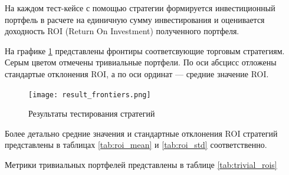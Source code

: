 На каждом тест-кейсе с помощью стратегии формируется инвестиционный портфель
в расчете на единичную сумму инвестирования и оценивается доходность ROI (Return On Investment) полученного портфеля.

На графике \ref{fig:result_frontier} представлены фронтиры соответсвующие торговым стратегиям.
Серым цветом отмечены тривиальные портфели.
По оси абсцисс отложены стандартые отклонения ROI, а по оси ординат --- средние значение ROI.

\begin{figure}[H]
	\centering
	\texttt{[image: result\_frontiers.png]}
	\caption{Результаты тестирования стратегий}
	\label{fig:result_frontier}
\end{figure}

Более детально средние значения и стандартные отклонения ROI стратегий представлены в таблицах
\ref{tab:roi_mean} и \ref{tab:roi_std} соответственно.

Метрики тривиальных портфелей представлены в таблице \ref{tab:trivial_rois}







